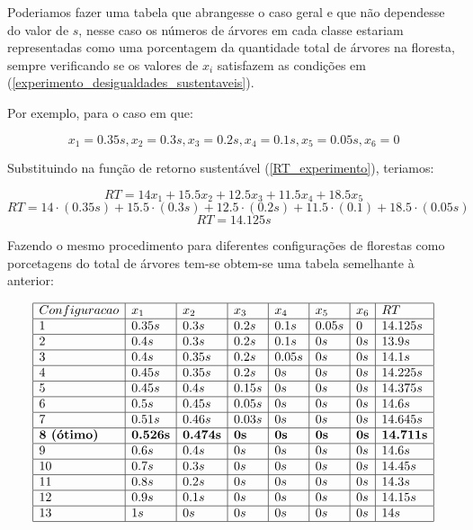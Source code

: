 \documentclass[a4paper, 12pt]{article}
\begin{document}
Poderiamos fazer uma tabela que abrangesse o caso geral e que não dependesse do valor de $s$, nesse caso os números de árvores em cada classe estariam representadas como uma porcentagem da quantidade total de árvores na floresta, sempre verificando se os valores de $x_i$ satisfazem as condições em (\ref{experimento_desigualdades_sustentaveis}).

Por exemplo, para o caso em que:

$$x_1=0.35s, x_2=0.3s, x_3=0.2s, x_4=0.1s, x_5=0.05s, x_6=0$$

Substituindo na função de retorno sustentável (\ref{RT_experimento}), teriamos:

$$RT=14x_1+15.5x_2+12.5x_3+11.5x_4+18.5x_5$$
$$RT=14\cdot (0.35s)+15.5\cdot \left(0.3s\right)+12.5\cdot \left(0.2s\right)+11.5\cdot \left(0.1\right)+18.5\cdot \left(0.05s\right)$$
$$RT=14.125s$$

Fazendo o mesmo procedimento para diferentes configurações de florestas como porcetagens do total de árvores tem-se obtem-se uma tabela semelhante à anterior:

$$\begin{array}{ | l | l | l | l | l | l | l | l | }
\hline
	Configuracao & x_1 & x_2 & x_3 & x_4 & x_5 & x_6 & RT \\ \hline
	1 & 0.35s & 0.3s & 0.2s & 0.1s & 0.05s & 0 & 14.125s \\ \hline
	2 & 0.4s & 0.3s & 0.2s & 0.1s & 0s & 0s & 13.9s \\ \hline
	3 & 0.4s & 0.35s & 0.2s & 0.05s & 0s & 0s & 14.1s \\ \hline
	4 & 0.45s & 0.35s & 0.2s & 0s & 0s & 0s & 14.225s \\ \hline
	5 & 0.45s & 0.4s & 0.15s & 0s & 0s & 0s & 14.375s \\ \hline
	6 & 0.5s & 0.45s & 0.05s & 0s & 0s & 0s & 14.6s \\ \hline
	7 & 0.51s & 0.46s & 0.03s & 0s & 0s & 0s & 14.645s \\ \hline
	\textbf{8 (ótimo)} & \textbf{0.526s} & \textbf{0.474s} & \textbf{0s} & \textbf{0s} & \textbf{0s} & \textbf{0s} & \textbf{14.711s} \\ \hline
	9 & 0.6s & 0.4s & 0s & 0s & 0s & 0s & 14.6s \\ \hline
	10 & 0.7s & 0.3s & 0s & 0s & 0s & 0s & 14.45s \\ \hline
	11 & 0.8s & 0.2s & 0s & 0s & 0s & 0s & 14.3s \\ \hline
	12 & 0.9s & 0.1s & 0s & 0s & 0s & 0s & 14.15s \\ \hline
	13 & 1s & 0s & 0s & 0s & 0s & 0s & 14s \\ \hline
\end{array}
$$
\end{document}
